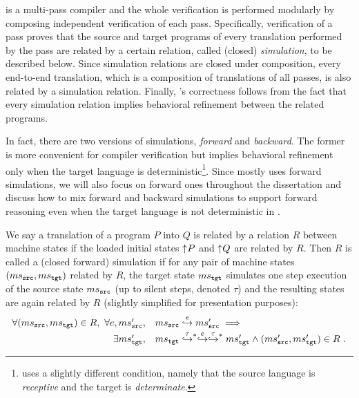 \cc{} is a multi-pass compiler and the whole verification is performed modularly
by composing independent verification of each pass. Specifically,
verification of a pass proves that the source and target programs of every translation
performed by the pass are related by a certain relation,
called (closed) \emph{simulation}, to be described below.
Since simulation relations are closed under composition, every
end-to-end translation, which is a composition of translations of all
passes, is also related by a simulation relation. Finally, \cc{}'s
correctness follows from the fact that every simulation relation implies
behavioral refinement between the related programs.

In fact, there are two versions of simulations, \emph{forward}
and \emph{backward}.  The former is more convenient for compiler
verification but implies behavioral refinement only when the target
language is deterministic\footnote{\cc{} uses a slightly different
  condition, namely that the source language is \emph{receptive} and
  the target is \emph{determinate}.}. Since \cc{} mostly uses forward
simulations, we will also focus on forward ones throughout the dissertation
and discuss how to mix forward and backward simulations
to support forward reasoning even when the target language is not deterministic
in .


We say a translation of a program $P$ into $Q$ is related by a
relation $R$ between machine states if the loaded initial states
${\uparrow}{P}$ and ${\uparrow}{Q}$ are related by $R$.
Then $R$ is called a (closed forward) simulation if for any
pair of machine states $(ms{}_{\texttt{src}{}},ms{}_{\texttt{tgt}{}})$ related by $R$, the target state $ms{}_{\texttt{tgt}{}}$ simulates one step
execution of the source state $ms{}_{\texttt{src}{}}$ (up to silent steps, denoted $\tau$) and the resulting
states are again related by $R$ (slightly simplified for presentation purposes):
\[
\begin{array}{r@{\ \ }l}
  \forall (\mssrc, \mstgt) \in R,~ \forall e, \mssrc',~&
  \mssrc \estep{e} \mssrc' \implies {}\\[1mm]
  \exists \mstgt',~&
  \mstgt \estep{\tau}^{\raisebox{-1mm}{\scriptsize$\ast$}} \estep{e}\estep{\tau}^{\raisebox{-1mm}{\scriptsize$\ast$}} \mstgt' \land (\mssrc', \mstgt') \in R~.
\end{array}
\]

